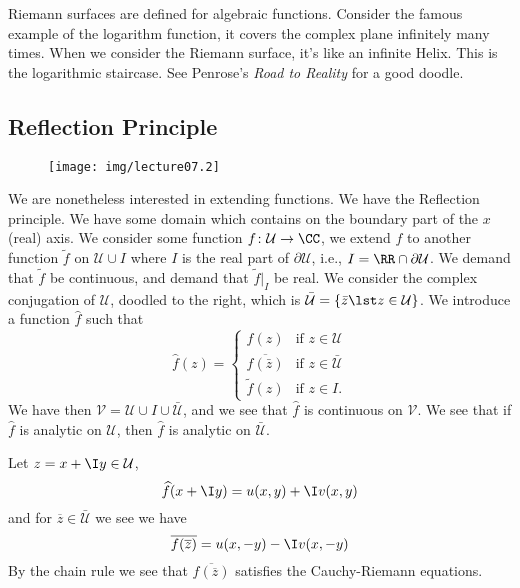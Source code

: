 Riemann surfaces are defined for algebraic functions. Consider
the famous example of the logarithm function, it covers the
complex plane infinitely many times. When we consider the Riemann
surface, it's like an infinite Helix. This is the logarithmic
staircase. See Penrose's \emph{Road to Reality} for a good
doodle.

\subsection{Reflection Principle}

\begin{wrapfigure}[10]{r}{1.5in}
\vspace{-50pt}
\begin{center}
\texttt{[image: img/lecture07.2]}
\end{center}
\vspace{-40pt}
\end{wrapfigure}
We are nonetheless interested in extending functions. We have the
Reflection principle. We have some domain which contains on the
boundary part of the $x$ (real) axis.
We consider some function $f\colon\mathcal{U}\to\CC$, we extend
$f$ to another function $\widetilde{f}$ on $\mathcal{U}\cup I$
where $I$ is the real part of $\partial\mathcal{U}$, i.e.,
$I=\RR\cap\partial\mathcal{U}$. We demand that $\widetilde{f}$ be
continuous, and demand that $\widetilde{f}|_{I}$ be real. We
consider the complex conjugation of $\mathcal{U}$, doodled to the
right, which is $\bar{\mathcal{U}}=\{\bar{z}\lst
z\in\mathcal{U}\}$. We introduce a function $\widehat{f}$ such
that
\[
\widehat{f}(z) = \begin{cases}
f(z) & \mbox{if }z\in\mathcal{U}\\
\overline{f(\bar{z})} & \mbox{if }z\in\bar{\mathcal{U}}\\
\widetilde{f}(z) & \mbox{if }z\in I.
\end{cases}
\]
We have then $\mathcal{V}=\mathcal{U}\cup
I\cup\bar{\mathcal{U}}$, and we see that $\widehat{f}$ is
continuous on $\mathcal{V}$. We see that if $\widehat{f}$ is
analytic on $\mathcal{U}$, then $\widehat{f}$ is analytic on
$\bar{\mathcal{U}}$. 

Let $z=x+\I y\in\mathcal{U}$,
\begin{equation}
\widehat{f}(x+\I y)=u(x,y)+\I v(x,y)
\end{equation}
and for $\overline{z}\in\bar{\mathcal{U}}$ we see we have
\begin{equation}
\overline{f(\overline{z})}=u(x,-y)-\I v(x,-y)
\end{equation}
By the chain rule we see that $\overline{f(\overline{z})}$ satisfies
the Cauchy-Riemann equations.

